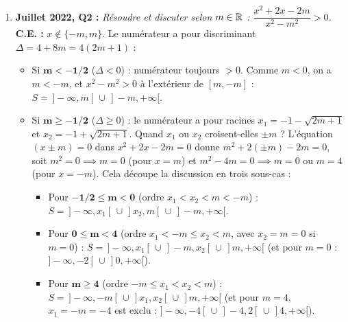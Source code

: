 \begin{exemple}
\begin{enumerate}
    \item \textbf{Juillet 2022, Q2 :} \emph{Résoudre et discuter selon $m \in \mathbb{R}$ : $\dfrac{x^2 + 2x - 2m}{x^2 - m^2} > 0$.}\\
    \textbf{C.E. :} $x \notin \{-m, m\}$. Le numérateur a pour discriminant $\Delta = 4 + 8m = 4(2m + 1)$ :
    \begin{itemize}
        \item Si $\mathbf{m < -1/2}$ ($\Delta < 0$) : numérateur toujours $> 0$. Comme $m < 0$, on a $m < -m$, et $x^2 - m^2 > 0$ à l'extérieur de $[m, -m]$ : $S = \,]-\infty, m[ \,\cup\, ]-m, +\infty[$.
        \item Si $\mathbf{m \ge -1/2}$ ($\Delta \ge 0$) : le numérateur a pour racines $x_1 = -1 - \sqrt{2m+1}$ et $x_2 = -1 + \sqrt{2m+1}$. Quand $x_1$ ou $x_2$ croisent-elles $\pm m$ ?
        L'équation $(x \pm m) = 0$ dans $x^2 + 2x - 2m = 0$ donne $m^2 + 2(\pm m) - 2m = 0$, soit $m^2 = 0 \implies m = 0$ (pour $x = m$) et $m^2 - 4m = 0 \implies m = 0 \text{ ou } m = 4$ (pour $x = -m$). Cela découpe la discussion en trois sous-cas :
        \begin{itemize}
            \item Pour $\mathbf{-1/2 \le m < 0}$ (ordre $x_1 < x_2 < m < -m$) : $S = \,]-\infty, x_1[ \,\cup\, ]x_2, m[ \,\cup\, ]-m, +\infty[$.
            \item Pour $\mathbf{0 \le m < 4}$ (ordre $x_1 < -m \le x_2 < m$, avec $x_2 = m = 0$ si $m=0$) : $S = \,]-\infty, x_1[ \,\cup\, ]-m, x_2[ \,\cup\, ]m, +\infty[$ (et pour $m = 0$ : $]-\infty, -2[ \,\cup\, ]0, +\infty[$).
            \item Pour $\mathbf{m \ge 4}$ (ordre $-m \le x_1 < x_2 < m$) : $S = \,]-\infty, -m[ \,\cup\, ]x_1, x_2[ \,\cup\, ]m, +\infty[$ (et pour $m = 4$, $x_1 = -m = -4$ est exclu : $]-\infty, -4[ \,\cup\, ]-4, 2[ \,\cup\, ]4, +\infty[$).
        \end{itemize}
    \end{itemize}


\end{enumerate}
\end{exemple}
